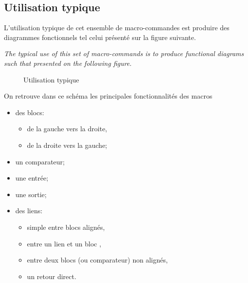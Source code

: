 \documentclass[a4paper,11pt]{article}                      %
\begin{document}
\subsection{Utilisation typique}
L'utilisation typique de cet ensemble de macro-commandes est produire  des diagrammes fonctionnels tel celui présenté sur la figure suivante.

\textit{The typical use of this set of macro-commands is to produce functional diagrams such that presented on the following figure.}

\begin{figure}[!htb]
\centering

\begin{tikzexample}[title=,righthand width=0.45\textwidth,]
\end{tikzexample}
\caption{Utilisation typique}
\label{fig:utiltyp}
\end{figure}



On retrouve dans ce schéma les principales fonctionnalités des macros
\begin{itemize}
\item des blocs:
\begin{itemize}
\item de la gauche vers la droite,
\item de la droite vers la gauche;
\end{itemize}
\item un comparateur;
\item une entrée;
\item une sortie;
\item des liens:
\begin{itemize}
\item  simple entre blocs alignés,
\item entre un lien et un bloc ,
\item entre deux blocs (ou comparateur) non alignés,
\item un retour direct.
\end{itemize}
\end{itemize}
\end{document}
